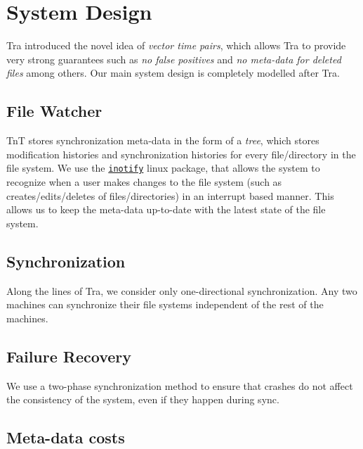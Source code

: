\section{System Design}

Tra introduced the novel idea of {\em vector time pairs}, which allows Tra to provide very strong guarantees such as {\em no false positives} and {\em no meta-data for deleted files} among others. Our main system design is completely modelled after Tra.

\subsection{File Watcher}
TnT stores synchronization meta-data in the form of a {\em tree}, which stores modification histories and synchronization histories for every file/directory in the file system. We use the \href{http://godoc.org/code.google.com/p/go.exp/inotify}{\tt inotify} linux package, that allows the system to recognize when a user makes changes to the file system (such as creates/edits/deletes of files/directories) in an interrupt based manner. This allows us to keep the meta-data up-to-date with the latest state of the file system.

\subsection{Synchronization}
Along the lines of Tra, we consider only one-directional synchronization. Any two machines can synchronize their file systems independent of the rest of the machines.

\subsection{Failure Recovery}
We use a two-phase synchronization method to ensure that crashes do not affect the consistency of the system, even if they happen during sync.

\subsection{Meta-data costs}